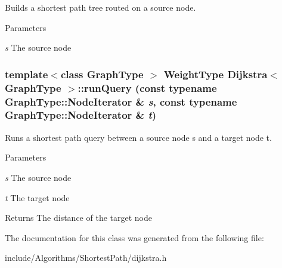 Builds a shortest path tree routed on a source node. 


\begin{DoxyParams}{Parameters}
\item[{\em s}]The source node \end{DoxyParams}
\hypertarget{class_dijkstra_a61e3b4e7447de9ab59aeb47408e04c3a}{
\subsubsection[{runQuery}]{\setlength{\rightskip}{0pt plus 5cm}template$<$class GraphType $>$ WeightType {\bf Dijkstra}$<$ GraphType $>$::runQuery (const typename GraphType::NodeIterator \& {\em s}, \/  const typename GraphType::NodeIterator \& {\em t})}}
\label{class_dijkstra_a61e3b4e7447de9ab59aeb47408e04c3a}


Runs a shortest path query between a source node s and a target node t. 


\begin{DoxyParams}{Parameters}
\item[{\em s}]The source node \item[{\em t}]The target node \end{DoxyParams}
\begin{DoxyReturn}{Returns}
The distance of the target node 
\end{DoxyReturn}


The documentation for this class was generated from the following file:\begin{DoxyCompactItemize}
\item 
include/Algorithms/ShortestPath/dijkstra.h\end{DoxyCompactItemize}
